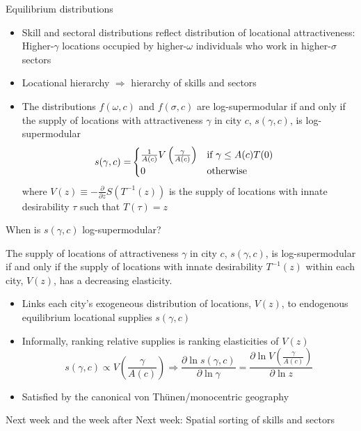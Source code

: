 \documentclass[11pt,notes=hide,aspectratio=169]{beamer}
\begin{document}
\begin{frame}{Equilibrium distributions}
\begin{itemize}
\item Skill and sectoral distributions reflect distribution of locational
attractiveness: Higher-$\gamma$ locations occupied by higher-$\omega$
individuals who work in higher-$\sigma$ sectors
\item Locational hierarchy $\Rightarrow$ hierarchy of skills and sectors
\item The distributions $f(\omega,c)$ and $f(\sigma,c)$ are log-supermodular
if and only if the supply of locations with attractiveness $\gamma$
in city $c$, $s(\gamma,c)$, is log-supermodular 
\begin{align*}
s(\gamma,c)= & \begin{cases}
\frac{1}{A(c)}V\left(\frac{\gamma}{A(c)}\right) & \textnormal{if }\gamma\leq A(c)T(0)\\
0 & \textnormal{otherwise}
\end{cases}
\end{align*}
where\textrm{ $V(z)\equiv-\frac{\partial}{\partial z}S\left(T^{-1}(z)\right)$
is }the supply of locations with innate desirability $\tau$ such
that $T(\tau)=z$
\end{itemize}
\end{frame}
\begin{frame}{When is $s(\gamma,c)$ log-supermodular?}
\begin{proposition}
\label{prop:LocationDistribution}The supply of locations of attractiveness
$\gamma$ in city $c$, $s(\gamma,c)$, is log-supermodular if and
only if the supply of locations with innate desirability \textrm{\textup{$T^{-1}(z)$}}
within each city, $V(z)$, has a decreasing elasticity.\end{proposition}
\begin{itemize}
\item Links each city's exogeneous distribution of locations, $V(z)$, to
endogenous equilibrium locational supplies $s(\gamma,c)$
\item Informally, ranking relative supplies is ranking elasticities of $V(z)$
\[
s(\gamma,c)\propto V\left(\frac{\gamma}{A(c)}\right)\Rightarrow\frac{\partial\ln s(\gamma,c)}{\partial\ln\gamma}=\frac{\partial\ln V\left(\frac{\gamma}{A(c)}\right)}{\partial\ln z}
\]
\item Satisfied by the canonical von Th\"{u}nen/monocentric geography
\end{itemize}
\end{frame}
\begin{frame}{Next week and the week after}
Next week: Spatial sorting of skills and sectors
\end{frame}
\end{document}
